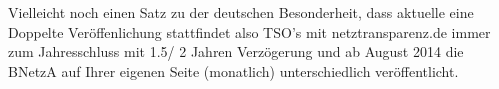  Vielleicht noch einen Satz zu der deutschen Besonderheit, dass aktuelle eine Doppelte Veröffenlichung stattfindet also TSO's mit netztransparenz.de immer zum Jahresschluss mit 1.5/ 2 Jahren Verzögerung und ab August 2014 die BNetzA auf Ihrer eigenen Seite (monatlich) unterschiedlich veröffentlicht.
 
 

